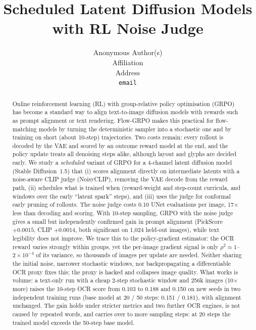 \documentclass{article}
\title{Scheduled Latent Diffusion Models with RL Noise Judge}
\author{%
  Anonymous Author(s) \\
  Affiliation \\
  Address \\
  \texttt{email} \\
}
\begin{document}
\maketitle

\begin{abstract}
Online reinforcement learning (RL) with group-relative policy optimisation (GRPO) has become a standard way to align
text-to-image diffusion models with rewards such as prompt alignment or text rendering. Flow-GRPO makes this practical for
flow-matching models by turning the deterministic sampler into a stochastic one and by training on short (about 10-step)
trajectories. Two costs remain: every rollout is decoded by the VAE and scored by an outcome reward model at the end, and the
policy update treats all denoising steps alike, although layout and glyphs are decided early. We study a \emph{scheduled}
variant of GRPO for a 4-channel latent diffusion model (Stable Diffusion~1.5) that (i) scores alignment directly on intermediate
latents with a noise-aware CLIP judge (NoisyCLIP), removing the VAE decode from the reward path, (ii) schedules what is trained
when (reward-weight and step-count curricula, and windows over the early ``latent spark'' steps), and (iii) uses the judge for
conformal early pruning of rollouts. The noise judge costs 0.10 UNet evaluations per image, 17$\times$ less than decoding and
scoring. With 10-step sampling, GRPO with the noise judge gives a small but independently confirmed gain in prompt alignment
(PickScore $+0.0015$, CLIP $+0.0014$, both significant on 1{,}024 held-out images), while text legibility does not improve. We
trace this to the policy-gradient estimator: the OCR reward varies strongly within groups, yet the per-image gradient signal
is only $\rho^2\approx 1$--$2\times10^{-4}$ of its variance, so thousands of images per update are needed. Neither sharing the
initial noise, narrower stochastic windows, nor backpropagating a differentiable OCR proxy fixes this; the proxy is hacked and
collapses image quality. What works is volume: a text-only run with a cheap 2-step stochastic window and 256k images (10$\times$
more) raises the 10-step OCR score from 0.103 to 0.188 and 0.150 on new seeds in two independent training runs (base model at
20 / 50 steps: 0.151 / 0.181), with alignment unchanged. The gain holds under stricter metrics and two further OCR engines, is not
caused by repeated words, and carries over to more sampling steps: at 20 steps the trained model exceeds the 50-step base model.
\end{abstract}
\end{document}
